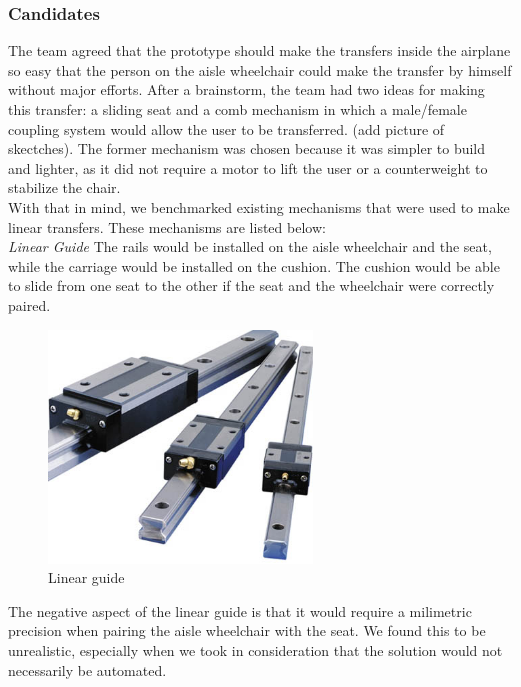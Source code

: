 \subsubsection{Candidates}
The team agreed that the prototype should make the transfers inside the airplane so easy that the person on the aisle wheelchair could make the transfer by himself without major efforts. After a brainstorm, the team had two ideas for making this transfer: a sliding seat and a comb mechanism in which a male/female coupling system would allow the user to be transferred. (add picture of skectches). The former mechanism was chosen because it was simpler to build and lighter, as it did not require a motor to lift the user or a counterweight to stabilize the chair. \\

With that in mind, we benchmarked existing mechanisms that were used to make linear transfers. These mechanisms are listed below: \\

\emph{Linear Guide}
The rails would be installed on the aisle wheelchair and the seat, while the carriage would be installed on the cushion. The cushion would be able to slide from one seat to the other if the seat and the wheelchair were correctly paired.

\begin{figure}[h]
\centering
\includegraphics[width=7cm]{brazil_images/image035.jpg}
\caption{Linear guide} %
\label{fig:linear_guide}
\end{figure}

The negative aspect of the linear guide is that it would require a milimetric precision when pairing the aisle wheelchair with the seat. We found this to be unrealistic, especially when we took in consideration that the solution would not necessarily be automated.

